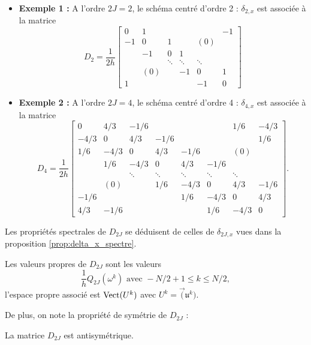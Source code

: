 \begin{itemize}
\item \textbf{Exemple 1 :} A l'ordre $2J=2$,  le schéma centré d'ordre 2 : $\delta_{2,x}$ est associée à la matrice
\begin{equation}
D_2 = \dfrac{1}{2h}
\begin{bmatrix}
0 & 1 &   &   &   & -1 \\ 
-1 & 0 & 1 &   & (0) &   \\ 
  & -1 & 0 & 1 &   &   \\ 
  &   & \ddots & \ddots & \ddots &   \\ 
  & (0) &   & -1 & 0 & 1 \\ 
1 &   &   &   & -1 & 0
\end{bmatrix} 
\label{eq:matrice_D2}
\end{equation}

\item \textbf{Exemple 2 :} A l'ordre $2J=4$,  le schéma centré d'ordre 4 : $\delta_{4,x}$ est associée à la matrice
\begin{equation}
D_4 = \dfrac{1}{2h}
\begin{bmatrix}
0 & 4/3 & -1/6 &   &   &   & 1/6 & -4/3 \\ 
-4/3 & 0 & 4/3 & -1/6 &   &   &   & 1/6 \\ 
1/6 & -4/3 & 0 & 4/3 & -1/6 &  & (0) &   \\ 
  & 1/6 & -4/3 & 0 & 4/3 & -1/6 &   &   \\ 
  &   & \ddots & \ddots & \ddots & \ddots & \ddots &   \\ 
  &  (0)& & 1/6 & -4/3 & 0 & 4/3 & -1/6 \\ 
-1/6 &   &   &   & 1/6 & -4/3 & 0 & 4/3 \\ 
4/3 & -1/6 &   &   &   & 1/6 & -4/3 & 0
\end{bmatrix}.
\end{equation}
\end{itemize}

Les propriétés spectrales de $D_{2J}$ se déduisent de celles de $\delta_{2J,x}$ vues dans la proposition \ref{prop:delta_x_spectre}.
\begin{proposition}
Les valeurs propres de $D_{2J}$ sont les valeurs 
\begin{equation}
\dfrac{1}{h}Q_{2J}(\omega^k) \text{ avec }-N/2 +1 \leq k \leq N/2,
\end{equation}
l'espace propre associé est $\text{Vect} (U^k)$ avec $U^k = \vec (\mathfrak{u}^k)$.
\end{proposition}
De plus, on note la propriété de symétrie de $D_{2J}$ :
\begin{proposition}
La matrice $D_{2J}$ est antisymétrique.
\end{proposition}

